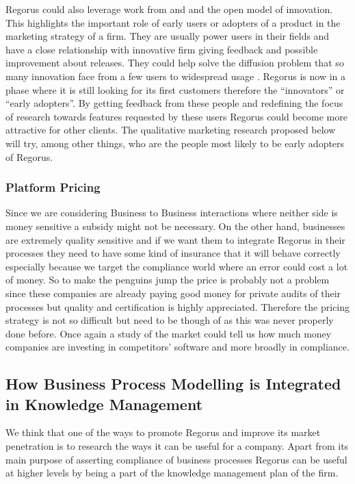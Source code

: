 \documentclass[10pt]{report}
\begin{document}
Regorus could also leverage work from \autocite{chesbrough2003} and \autocite{chesbrough2006} and the open model of innovation. This highlights the important role of early users or adopters of a product in the marketing strategy of a firm. They are usually power users in their fields and have a close relationship with innovative firm giving feedback and possible improvement about releases. They could help solve the diffusion problem that so many innovation face from a few users to widespread usage \autocite{rogers2010}. Regorus is now in a phase where it is still looking for its first customers therefore the \enquote{innovators} or \enquote{early adopters}. By getting feedback from these people and redefining the focus of research towards features requested by these users Regorus could become more attractive for  other clients. The qualitative marketing research proposed below will try, among other things, who are the people most likely to be early adopters of Regorus.

\subsubsection{Platform Pricing} 
Since we are considering Business to Business interactions where neither side is money sensitive a subsidy might not be necessary. On the other hand, businesses are extremely quality sensitive and if we want them to integrate Regorus in their processes they need to have some kind of insurance that it will behave correctly especially because we target the compliance world where an error could cost a lot of money. So to make the penguins jump the price is probably not a problem since these companies are already paying good money for private audits of their processes but quality and certification is highly appreciated. Therefore the pricing strategy is not so difficult but need to be though of as this was never properly done before. Once again a study of the market could tell us how much money companies are investing in competitors' software and more broadly in compliance.




\subsection{How Business Process Modelling is Integrated in Knowledge Management}

We think that one of the ways to promote Regorus and improve its market penetration is to research the ways it can be useful for a company. Apart from its main purpose of asserting compliance of business processes Regorus can be useful at higher levels by being a part of the knowledge management plan of the firm.
\end{document}
